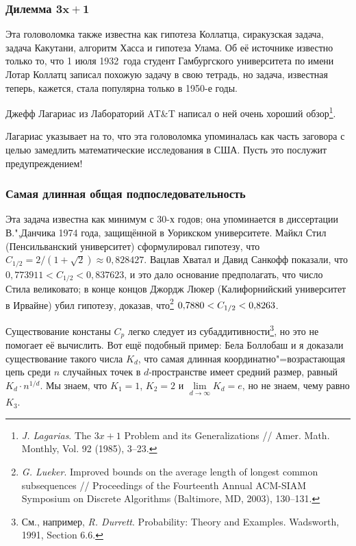 \documentclass[twoside]{book}
\begin{document}
\subsubsection*{Дилемма $\bm{3x+1}$}

Эта головоломка также известна как гипотеза Коллатца, сиракузская задача, задача Какутани, алгоритм Хасса и гипотеза Улама.
Об её источнике известно только то, что 1 июля 1932~года студент Гамбургского университета по имени Лотар Коллатц записал похожую задачу в свою тетрадь, но задача, известная теперь, кажется, стала популярна только в 1950-е годы.

Джефф Лагариас из Лабораторий AT\&T написал о ней очень хороший
обзор\footnote{\emph{J. Lagarias}. The $3x+1$ Problem and its Generalizations /\!/ {Amer. Math. Monthly}, Vol. 92 (1985), 3--23.%
}.

Лагариас указывает на то, что эта головоломка упоминалась как часть заговора с целью замедлить математические исследования в США.
Пусть это послужит предупреждением!

\subsubsection*{Самая длинная общая подпоследовательность}

Эта задача известна как минимум с 30-х годов;
она упоминается в диссертации В.",Данчика 1974 года, защищённой в Уорикском университете.
\mbox{Майкл} Стил (Пенсильванский университет) сформулировал гипотезу, что $C_{1/2} = 2/(1+\sqrt{2})\approx 0{,}828427$.
Вацлав Хватал и Давид Санкофф показали, что $0{,}773911 < C_{1/2} < 0{,}837623$, и это дало основание предполагать, что число Стила великовато;
в конце концов Джордж Люкер (Калифорнийский университет в Ирвайне) убил гипотезу, доказав, что\footnote{
\emph{G. Lueker}. 
Improved bounds on the average length of longest common subsequences /\!/ {Proceedings of the Fourteenth Annual ACM-SIAM Symposium on Discrete Algorithms} (Baltimore, MD, 2003), 130–131.}
$0{,}7880 \z< C_{1/2} \z< 0{,}8263$.

Существование констаны $C_p$ легко следует из субаддитивности\footnote{См., например, \emph{R. Durrett}. {Probability: Theory and Examples}. Wadsworth, 1991, Section 6.6.}, но это не помогает её вычислить.
Вот ещё подобный пример: Бела Боллобаш и я доказали существование такого числа $K_d$, что самая длинная координатно"=возрастающая цепь среди $n$ случайных точек в $d$-пространстве имеет средний размер, равный $K_d\cdot n^{1/d}$.
Мы знаем, что $K_1=1$, $K_2=2$ и $\lim\limits_{d\to\infty} K_d=e$, но не знаем, чему равно $K_3$.
\end{document}
